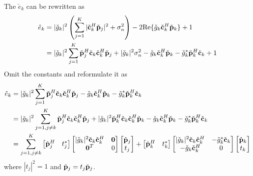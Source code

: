 The $\check{e}_k$ can be rewritten as
\begin{align}
    \check{e}_k &= |\check{g}_k|^2 \left( \sum_{j=1}^K |\check{\bf c}_k^H \check{\bf p}_j|^2 + \sigma_n^2 \right) - 2\mathrm{Re}\{ \check{g}_k \check{\bf c}_k^H \check{\bf p}_k\} + 1 \nonumber
    \\ & = |\check{g}_k|^2 \sum_{j=1}^K \check{\bf p}_j^H \check{\bf c}_k \check{\bf c}_k^H \check{\bf p}_j + |\check{g}_k|^2\sigma_n^2 - \check{g}_k \check{\bf c}_k^H \check{\bf p}_k - \check{g}_k^*\check{\bf p}_k^H \check{\bf c}_k + 1
\end{align}
Omit the constants and reformulate it as
\begin{align} 
    \hat{e}_k & = |\check{g}_k|^2 \sum_{j=1}^K \check{\bf p}_j^H \check{\bf c}_k \check{\bf c}_k^H \check{\bf p}_j  - \check{g}_k \check{\bf c}_k^H \check{\bf p}_k - \check{g}_k^* \check{\bf p}_k^H \check{\bf c}_k \nonumber
    \\ &=|\check{g}_k|^2\sum_{j=1,j\neq k}^K \check{\bf p}_j^H \check{\bf c}_k \check{\bf c}_k^H \check{\bf p}_j +|\check{g}_k|^2 \check{\bf p}_k^H \check{\bf c}_k \check{\bf c}_k^H \check{\bf p}_k - \check{g}_k \check{\bf c}_k^H \check{\bf p}_k - \check{g}_k^* \check{\bf p}_k^H \check{\bf c}_k \nonumber
    \\ & = \sum_{j=1,j \neq k}^K \begin{bmatrix} \hat{\bf p}_j^H & t_j^*\end{bmatrix} \begin{bmatrix} |\check{g}_k|^2 \check{\bf c}_k \check{\bf c}_k^H & {\bf 0} \\ {\bf 0}^T & 0 \end{bmatrix}  \begin{bmatrix} \hat{\bf p}_j \\ t_j\end{bmatrix} + \begin{bmatrix}   \hat{\bf p}_k^H & t_k^*\end{bmatrix}\begin{bmatrix} |\check{g}_k|^2 \check{\bf c}_k \check{\bf c}_k^H & -\check{g}_k^*\check{\bf c}_k \\ -\check{g}_k \check{\bf c}_k^H & 0 \end{bmatrix} \begin{bmatrix} \hat{\bf p}_k \\ t_k \end{bmatrix} 
\end{align}
where $|t_j|^2 = 1$ and $\hat{\bf p}_j = t_j \check{\bf p}_j$.

